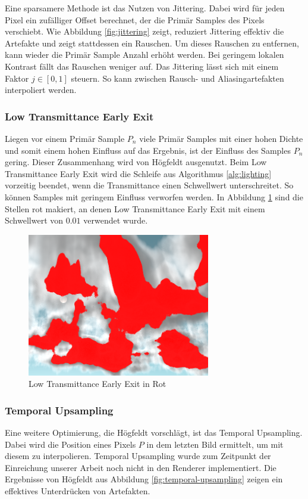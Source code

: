Eine sparsamere Methode ist das Nutzen von Jittering. Dabei wird für jeden Pixel ein zufälliger Offset berechnet, der die Primär Samples des Pixels verschiebt. Wie Abbildung \ref{fig:jittering} zeigt, reduziert Jittering effektiv die Artefakte und zeigt stattdessen ein Rauschen. Um dieses Rauschen zu entfernen, kann wieder die Primär Sample Anzahl erhöht werden. Bei geringem lokalen Kontrast fällt das Rauschen weniger auf. Das Jittering lässt sich mit einem Faktor $ j \in [0, 1] $ steuern. So kann zwischen Rausch- und Aliasingartefakten interpoliert werden.

\subsubsection{Low Transmittance Early Exit}
Liegen vor einem Primär Sample $ P_n $ viele Primär Samples mit einer hohen Dichte und somit einem hohen Einfluss auf das Ergebnis, ist der Einfluss des Samples $ P_n $ gering. Dieser Zusammenhang wird von Högfeldt \cite{Högfeldt16} ausgenutzt. Beim Low Transmittance Early Exit wird die Schleife aus Algorithmus \ref{alg:lighting} vorzeitig beendet, wenn die Transmittance einen Schwellwert unterschreitet. So können Samples mit geringem Einfluss verworfen werden. In Abbildung \ref{fig:low-early-exit} sind die Stellen rot makiert, an denen Low Transmittance Early Exit mit einem Schwellwert von $ 0.01 $ verwendet wurde.

\begin{figure}[H]
    \centering
    \includegraphics[width=8cm]{media/early-exit.png}
    \caption{Low Transmittance Early Exit in Rot}
    \label{fig:low-early-exit}
\end{figure}

\subsubsection{Temporal Upsampling}
Eine weitere Optimierung, die Högfeldt \cite{Högfeldt16} vorschlägt, ist das Temporal Upsampling. Dabei wird die Position eines Pixels $ P $ in dem letzten Bild ermittelt, um mit diesem zu interpolieren. Temporal Upsampling wurde zum Zeitpunkt der Einreichung unserer Arbeit noch nicht in den Renderer implementiert. Die Ergebnisse von Högfeldt aus Abbildung \ref{fig:temporal-upsampling} zeigen ein effektives Unterdrücken von Artefakten.

